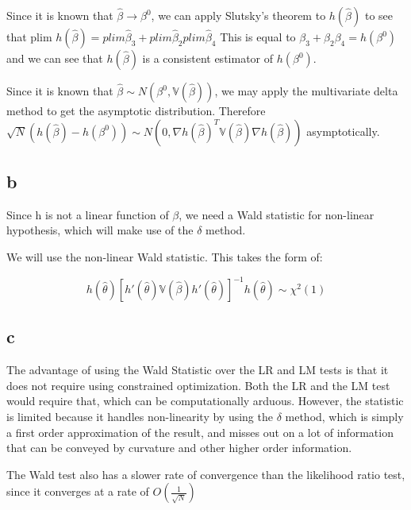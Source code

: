 \documentclass[11pt]{article}
\begin{document}
Since it is known that $\hat{\beta} \to \beta^0$, we can apply Slutsky's
theorem to $h( \hat{ \beta } )$ to see that plim $h( \hat{ \beta } ) =
plim \hat{\beta}_3 + plim \hat{\beta}_2  plim \hat{\beta}_4$ This is equal to
$\beta_{\text{3}} + \beta_{\text{2}} \beta_{\text{4}} = h( \beta^{\text{0}} )$ and we
can see that $h( \hat{ \beta } )$ is a consistent estimator of $h(
\beta^{0} )$.

Since it is known that $\hat{ \beta } \sim N( \beta^0, \mathbb{V}(\hat{\beta}) )$, we
may apply the multivariate delta method to get the asymptotic
distribution. Therefore $\sqrt{N} ( h( \hat{\beta} ) - h( \beta^0 ) ) \sim N( 0,
\nabla h( \hat{\beta} )^T \mathbb{V}( \hat{\beta} ) \nabla h( \hat{\beta} ) )$
asymptotically.



\subsection{b}
\label{sec-2-2}
Since h is not a linear function of $\beta$, we need a Wald statistic for
non-linear hypothesis, which will make use of the $\delta$ method.

We will use the non-linear Wald statistic. This takes the form of: 


$$ h(\hat{\theta}) [ h'( \hat{\theta} ) \mathbb{ V }( \hat{ \beta} ) h'( \hat{\theta} ) ]^{-1} h( \hat{\theta} ) \sim \chi^2 ( 1 )$$

\subsection{c}
\label{sec-2-3}
The advantage of using the Wald Statistic over the LR and LM tests is
that it does not require using constrained optimization. Both the LR
and the LM test would require that, which can be computationally
arduous. However, the statistic is limited because it handles
non-linearity by using the $\delta$ method, which is simply a first order
approximation of the result, and misses out on a lot of information
that can be conveyed by curvature and other higher order information.

The Wald test also has a slower rate of convergence than the likelihood
ratio test, since it converges at a rate of $O( \frac{ 1} {\sqrt{N} } )$
\end{document}
